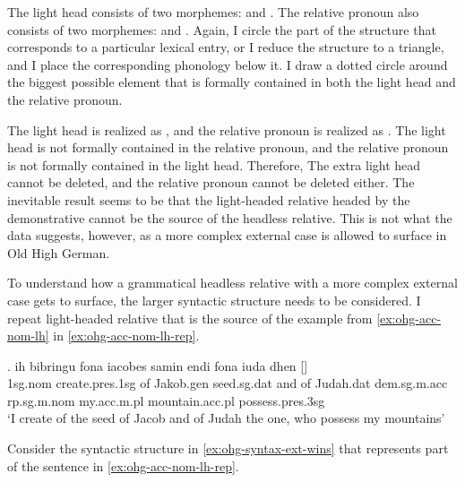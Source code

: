 The light head consists of two morphemes:  and .
The relative pronoun also consists of two morphemes:  and .
Again, I circle the part of the structure that corresponds to a particular lexical entry, or I reduce the structure to a triangle, and I place the corresponding phonology below it.
I draw a dotted circle around the biggest possible element that is formally contained in both the light head and the relative pronoun.

The light head is realized as , and the relative pronoun is realized as .
The light head is not formally contained in the relative pronoun, and the relative pronoun is not formally contained in the light head.
Therefore, The extra light head cannot be deleted, and the relative pronoun cannot be deleted either.
The inevitable result seems to be that the light-headed relative headed by the demonstrative cannot be the source of the headless relative.
This is not what the data suggests, however, as a more complex external case is allowed to surface in Old High German.

To understand how a grammatical headless relative with a more complex external case gets to surface, the larger syntactic structure needs to be considered. I repeat light-headed relative that is the source of the example from \ref{ex:ohg-acc-nom-lh} in \ref{ex:ohg-acc-nom-lh-rep}.

\exg. ih bibringu fona iacobes samin endi fona iuda dhen []   \\
1\ac{sg}.\ac{nom} {create}.\ac{pres}.1\ac{sg}\scsub{[acc]} of Jakob.\ac{gen} seed.\ac{sg}.\ac{dat} and of Judah.\ac{dat} \ac{dem}.\ac{sg}.\ac{m}.\ac{acc} \ac{rp}.\ac{sg}.\ac{m}.\ac{nom} my.\ac{acc}.\ac{m}.\ac{pl} mountain.\ac{acc}.\ac{pl} possess.\ac{pres}.3\ac{sg}\scsub{[nom]}\\
`I create of the seed of Jacob and of Judah the one, who possess my mountains' \label{ex:ohg-acc-nom-lh-rep}

Consider the syntactic structure in \ref{ex:ohg-syntax-ext-wins} that represents part of the sentence in \ref{ex:ohg-acc-nom-lh-rep}.

